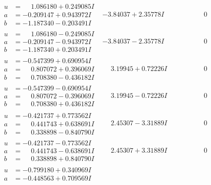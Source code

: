 \documentclass[1p]{elsarticle_modified}
\theoremstyle{definition}
\begin{document}
$$\begin{array}{c|c|c}
 \hline 
\begin{aligned}
u &= \phantom{-}1.086180 + 0.249085 I \\
a &= -0.209147 + 0.943972 I \\
b &= -1.187340 - 0.203491 I\end{aligned}
 & -3.84037 + 2.35778 I & \phantom{-0.000000 } 0 \\ \hline\begin{aligned}
u &= \phantom{-}1.086180 - 0.249085 I \\
a &= -0.209147 - 0.943972 I \\
b &= -1.187340 + 0.203491 I\end{aligned}
 & -3.84037 - 2.35778 I & \phantom{-0.000000 } 0 \\ \hline\begin{aligned}
u &= -0.547399 + 0.690954 I \\
a &= \phantom{-}0.807072 + 0.396069 I \\
b &= \phantom{-}0.708380 - 0.436182 I\end{aligned}
 & \phantom{-}3.19945 + 0.72226 I & \phantom{-0.000000 } 0 \\ \hline\begin{aligned}
u &= -0.547399 - 0.690954 I \\
a &= \phantom{-}0.807072 - 0.396069 I \\
b &= \phantom{-}0.708380 + 0.436182 I\end{aligned}
 & \phantom{-}3.19945 - 0.72226 I & \phantom{-0.000000 } 0 \\ \hline\begin{aligned}
u &= -0.421737 + 0.773562 I \\
a &= \phantom{-}0.441743 + 0.638691 I \\
b &= \phantom{-}0.338898 - 0.840790 I\end{aligned}
 & \phantom{-}2.45307 - 3.31889 I & \phantom{-0.000000 } 0 \\ \hline\begin{aligned}
u &= -0.421737 - 0.773562 I \\
a &= \phantom{-}0.441743 - 0.638691 I \\
b &= \phantom{-}0.338898 + 0.840790 I\end{aligned}
 & \phantom{-}2.45307 + 3.31889 I & \phantom{-0.000000 } 0 \\ \hline\begin{aligned}
u &= -0.799180 + 0.340969 I \\
a &= -0.448563 + 0.709569 I \\

\end{aligned}
\end{array}$$
\end{document}
